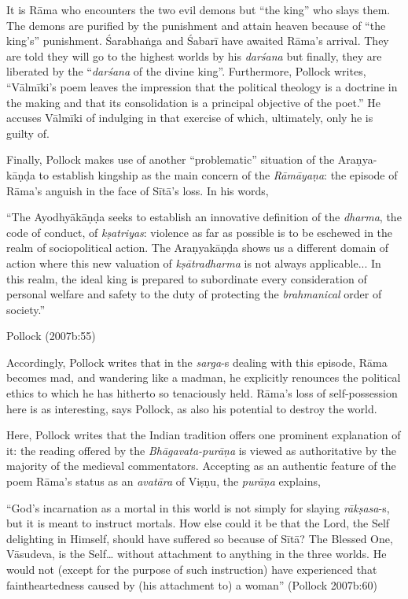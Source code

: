 It is Rāma who encounters the two evil demons but “the king” who slays them. The demons are purified by the punishment and attain heaven because of “the king’s” punishment. Śarabhaṅga and Śabarī have awaited Rāma’s arrival. They are told they will go to the highest worlds by his {\sl darśana} but finally, they are liberated by the “{\sl darśana} of the divine king”. Furthermore, Pollock writes, “Vālmīki’s poem leaves the impression that the political theology is a doctrine in the making and that its consolidation is a principal objective of the poet.” He accuses Vālmīki of indulging in that exercise of which, ultimately, only he is guilty of. 

Finally, Pollock makes use of another “problematic” situation of the Araṇya-kāṇḍa to establish kingship as the main concern of the {\sl Rāmāyaṇa}: the episode of Rāma’s anguish in the face of Sītā’s loss. In his words, 

\begin{myquote}
“The Ayodhyākāṇḍa seeks to establish an innovative definition of the {\sl dharma}, the code of conduct, of {\sl kṣatriyas}: violence as far as possible is to be eschewed in the realm of sociopolitical action. The Araṇyakāṇḍa shows us a different domain of action where this new valuation of {\sl kṣātradharma} is not always applicable... In this realm, the ideal king is prepared to subordinate every consideration of personal welfare and safety to the duty of protecting the {\sl brahmanical} order of society.”

\hfill	 Pollock (2007b:55)
\end{myquote}

Accordingly, Pollock writes that in the {\sl sarga}-s dealing with this episode, Rāma becomes mad, and wandering like a madman, he explicitly renounces the political ethics to which he has hitherto so tenaciously held. Rāma’s loss of self-possession here is as interesting, says Pollock, as also his potential to destroy the world. 


Here, Pollock writes that the Indian tradition offers one prominent explanation of it:  the reading offered by the {\sl Bhāgavata-purāṇa} is viewed as authoritative by the majority of the medieval commentators. Accepting as an authentic feature of the poem Rāma’s status as an {\sl avatāra} of Viṣṇu, the {\sl purāṇa} explains, 

\begin{myquote}
“God's incarnation as a mortal in this world is not simply for slaying {\sl rākṣasa}-s, but it is meant to instruct mortals. How else could it be that the Lord, the Self delighting in Himself, should have suffered so because of Sītā? The Blessed One, Vāsudeva, is the Self… without attachment to anything in the three worlds. He would not (except for the purpose of such instruction) have experienced that faintheartedness caused by (his attachment to) a woman” (Pollock 2007b:60)
\end{myquote}

